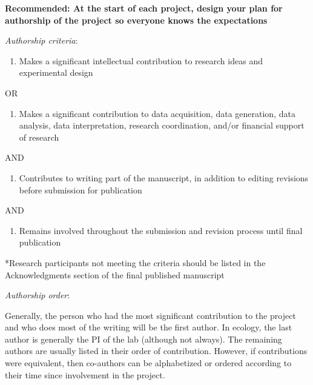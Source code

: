 \documentclass[
]{book}
\providecommand{\tightlist}{%
  \setlength{\itemsep}{0pt}\setlength{\parskip}{0pt}}
\begin{document}
\textbf{Recommended: At the start of each project, design your plan for authorship of the project so
everyone knows the expectations}

\emph{Authorship criteria}:

\begin{enumerate}
\def\labelenumi{\arabic{enumi})}
\tightlist
\item
  Makes a significant intellectual contribution to research ideas and experimental design
\end{enumerate}

OR

\begin{enumerate}
\def\labelenumi{\arabic{enumi})}
\setcounter{enumi}{1}
\tightlist
\item
  Makes a significant contribution to data acquisition, data generation, data analysis, data
  interpretation, research coordination, and/or financial support of research
\end{enumerate}

AND

\begin{enumerate}
\def\labelenumi{\arabic{enumi})}
\setcounter{enumi}{2}
\tightlist
\item
  Contributes to writing part of the manuscript, in addition to editing revisions before
  submission for publication
\end{enumerate}

AND

\begin{enumerate}
\def\labelenumi{\arabic{enumi})}
\setcounter{enumi}{3}
\tightlist
\item
  Remains involved throughout the submission and revision process until final publication
\end{enumerate}

*Research participants not meeting the criteria should be listed in the Acknowledgments
section of the final published manuscript

\emph{Authorship order}:

Generally, the person who had the most significant contribution to the project and who does
most of the writing will be the first author. In ecology, the last author is generally the PI of the
lab (although not always). The remaining authors are usually listed in their order of
contribution. However, if contributions were equivalent, then co-authors can be alphabetized
or ordered according to their time since involvement in the project.
\end{document}
